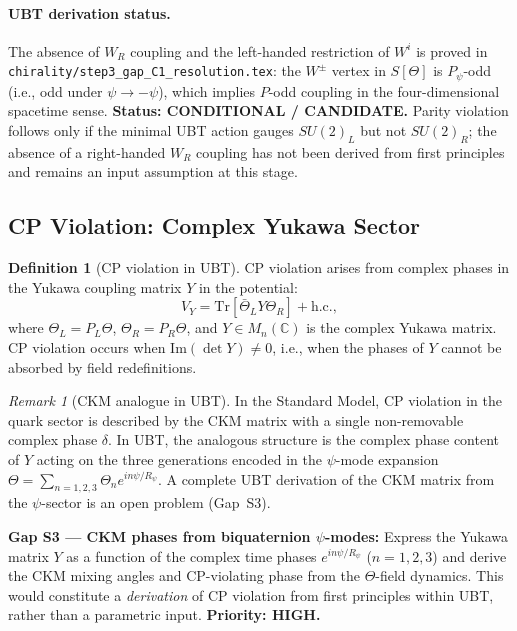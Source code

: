 \documentclass[12pt,a4paper]{article}
\theoremstyle{definition}
\newtheorem{definition}[theorem]{Definition}
\theoremstyle{remark}
\newtheorem{remark}[theorem]{Remark}
\begin{document}
\paragraph{UBT derivation status.}
The absence of $W_R$ coupling and the left-handed restriction of $W^i$ is
proved in \texttt{chirality/step3\_gap\_C1\_resolution.tex}: the
$W^\pm$ vertex in $S[\Theta]$ is $P_\psi$-odd (i.e., odd under $\psi \to -\psi$),
which implies $P$-odd coupling in the four-dimensional spacetime sense.
\textbf{Status: CONDITIONAL / CANDIDATE.}
Parity violation follows only if the minimal UBT action gauges $SU(2)_L$ but not $SU(2)_R$;
the absence of a right-handed $W_R$ coupling has not been derived from first principles
and remains an input assumption at this stage.

\subsection{CP Violation: Complex Yukawa Sector}
\label{subsec:cat:CP}

\begin{definition}[CP violation in UBT]
\label{def:cat:CP_breaking}
CP violation arises from complex phases in the Yukawa coupling matrix $Y$
in the potential:
\begin{equation}
  V_Y = \mathrm{Tr}[\bar\Theta_L Y \Theta_R] + \mathrm{h.c.},
  \label{eq:cat:V_Yukawa}
\end{equation}
where $\Theta_L = P_L\Theta$, $\Theta_R = P_R\Theta$, and
$Y \in M_n(\mathbb{C})$ is the complex Yukawa matrix.
CP violation occurs when $\mathrm{Im}(\det Y) \neq 0$, i.e., when the
phases of $Y$ cannot be absorbed by field redefinitions.
\end{definition}

\begin{remark}[CKM analogue in UBT]
In the Standard Model, CP violation in the quark sector is described by the
CKM matrix with a single non-removable complex phase $\delta$.
In UBT, the analogous structure is the complex phase content of $Y$ acting
on the three generations encoded in the $\psi$-mode expansion
$\Theta = \sum_{n=1,2,3} \Theta_n e^{in\psi/R_\psi}$.
A complete UBT derivation of the CKM matrix from the $\psi$-sector is an
open problem (Gap~S3).
\end{remark}

\begin{gapbox}
\textbf{Gap S3 --- CKM phases from biquaternion $\psi$-modes:}
Express the Yukawa matrix $Y$ as a function of the complex time phases
$e^{in\psi/R_\psi}$ ($n = 1,2,3$) and derive the CKM mixing angles and
CP-violating phase from the $\Theta$-field dynamics.
This would constitute a \emph{derivation} of CP violation from first
principles within UBT, rather than a parametric input.
\textbf{Priority: HIGH.}
\end{gapbox}
\end{document}
